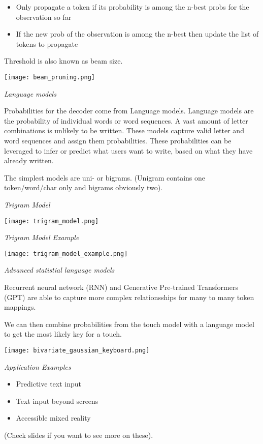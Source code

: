 \begin{itemize}[itemsep=-5pt, topsep=0pt, leftmargin=*]
	\item Only propagate a token if its probability is among the n-best probs for the observation so far 
	\item If the new prob of the observation is among the n-best then update the list of tokens to propagate
\end{itemize}

Threshold is also known as beam size. 

\begin{center}
	\texttt{[image: beam\_pruning.png]}
\end{center}

\textit{Language models} \medskip

Probabilities for the decoder come from Language models. Language models are the probability of individual words or word sequences. 
A vast amount of letter combinations is unlikely to be written. These models capture valid letter and word sequences and assign them probabilities. 
These probabilities can be leveraged to infer or predict what users want to write, based on what they have already written. \medskip

The simplest models are uni- or bigrams. (Unigram contains one token/word/char only and bigrams obviously two). \medskip

\textit{Trigram Model}

\begin{center}
	\texttt{[image: trigram\_model.png]}
\end{center}

\textit{Trigram Model Example}

\begin{center}
	\texttt{[image: trigram\_model\_example.png]}
\end{center}

\textit{Advanced statistial language models} \smallskip

Recurrent neural network (RNN) and Generative Pre-trained Transformers (GPT) are able to capture more complex relationsships for many to many token mappings. 

\medskip

We can then combine probabilities from the touch model with a language model to get the most likely key for a touch. 


\begin{center}
	\texttt{[image: bivariate\_gaussian\_keyboard.png]}
\end{center}

\textit{Application Examples} \smallskip

\begin{itemize}[itemsep=-5pt, topsep=0pt, leftmargin=*]
	\item Predictive text input
	\item Text input beyond screens
	\item Accessible mixed reality
\end{itemize}

(Check slides if you want to see more on these).


\columnbreak
